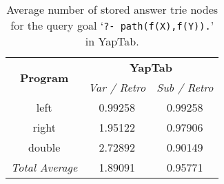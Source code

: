 \begin{table}[ht]
\centering
  \begin{tabular}{ccc}
   \hline
    \hline
    \multirow{2}{*}{\textbf{Program}} & \multicolumn{2}{c}{\textbf{YapTab}} \\
    & \textit{\small{Var / Retro}} & \textit{\small{Sub / Retro}} \\
   \hline
   \hline
   left & 0.99258 & 0.99258 \\
   right & 1.95122 & 0.97906 \\
   double & 2.72892 & 0.90149 \\
\hline
\hline
\textit{Total Average} & 1.89091 &  0.95771 \\
\hline
\hline
\end{tabular}
\caption{Average number of stored answer trie nodes for the query goal `\texttt{?-~path(f(X),f(Y)).}' in YapTab.}
\label{tbl:results_average_stst_space}
\end{table}

